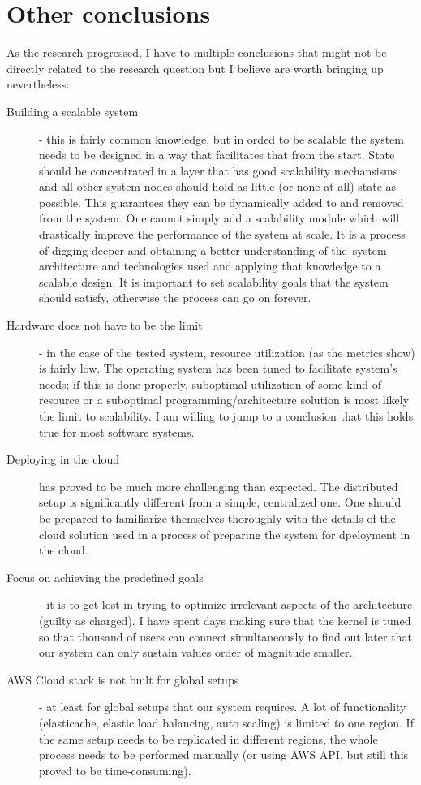 \documentclass{uvamscse}
\begin{document}
\section{Other conclusions}
As the research progressed, I have to multiple conclusions that might not be directly related to the research question but I believe are worth bringing up nevertheless:
\begin{description}
  \item[Building a scalable system] - this is fairly common knowledge, but in orded to be scalable the system needs to be designed in a way that facilitates that from the start. State should be concentrated in a layer that has good scalability mechansisms and all other system nodes should hold as little (or none at all) state as possible. This guarantees they can be dynamically added to and removed from the system. One cannot simply add a scalability module which will drastically improve the performance of the system at scale. It is a process of digging deeper and obtaining a better understanding of the system architecture and technologies used and applying that knowledge to a scalable design. It is important to set scalability goals that the system should satisfy, otherwise the process can go on forever.
  \item[Hardware does not have to be the limit] - in the case of the tested system, resource utilization (as the metrics show) is fairly low. The operating system has been tuned to facilitate system's needs; if this is done properly, suboptimal utilization of some kind of resource or a suboptimal programming/architecture solution is most likely the limit to scalability. I am willing to jump to a conclusion that this holds true for most software systems.
  \item[Deploying in the cloud] has proved to be much more challenging than expected. The distributed setup is significantly different from a simple, centralized one. One should be prepared to familiarize themselves thoroughly with the details of the cloud solution used in a process of preparing the system for dpeloyment in the cloud.
  \item[Focus on achieving the predefined goals] - it is to get lost in trying to optimize irrelevant aspects of the architecture (guilty as charged). I have spent days making sure that the kernel is tuned so that thousand of users can connect simultaneously to find out later that our system can only sustain values order of magnitude smaller.
  \item[AWS Cloud stack is not built for global setups] - at least for global setups that our system requires. A lot of functionality (elasticache, elastic load balancing, auto scaling) is limited to one region. If the same setup needs to be replicated in different regions, the whole process needs to be performed manually (or using AWS API, but still this proved to be time-consuming).

\end{description}
\end{document}
